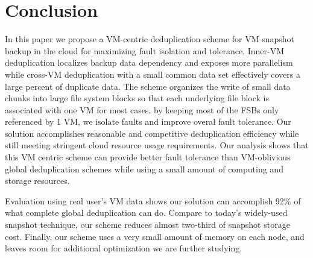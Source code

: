 \section{Conclusion}
\label{sect:final}
In this paper we propose a VM-centric deduplication scheme for 
VM snapshot backup in the cloud for maximizing fault isolation and tolerance. 
Inner-VM deduplication localizes backup data dependency and exposes more parallelism  
while cross-VM deduplication with a small common data set
effectively  covers a large percent of duplicate data.
The scheme organizes the write of small data chunks into large file system blocks so
that each underlying file block is associated with one VM for most cases.
by keeping most of the FSBs only referenced by 1 VM, we isolate faults and improve overal fault tolerance.
Our solution accomplishes reasonable and competitive deduplication efficiency while
still meeting stringent cloud resource usage requirements. 
Our analysis shows that  this VM centric scheme 
can  provide  better fault tolerance than VM-oblivious global deduplication schemes
while using a small amount of computing and storage resources. 


Evaluation using real user's VM data shows
our solution can accomplish 92\% of what complete global
deduplication can do. 
Compare to today's widely-used snapshot technique, our scheme reduces almost
two-third of snapshot storage cost.
Finally, our scheme uses a very small amount of memory on each node, and leaves
room for additional optimization we are further studying.




 
